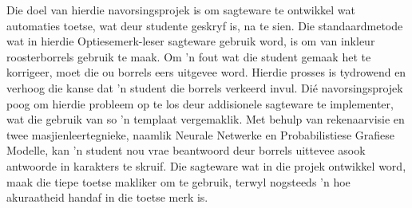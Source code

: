 
\begin{uittreksel}    %
Die doel van hierdie navorsingsprojek is om sagteware te ontwikkel wat automaties toetse, wat deur studente geskryf is, na te sien. Die standaardmetode wat in hierdie Optiesemerk-leser sagteware gebruik word, is om van inkleur roosterborrels gebruik te maak. Om 'n fout wat die student gemaak het te korrigeer, moet die ou borrels eers uitgevee word. Hierdie prosses is tydrowend en verhoog die kanse dat 'n student die borrels verkeerd invul. Dié navorsingsprojek poog om hierdie probleem op te los deur addisionele sagteware te implementer, wat die gebruik van so 'n templaat vergemaklik. Met behulp van rekenaarvisie en twee masjienleertegnieke, naamlik Neurale Netwerke en Probabilistiese Grafiese Modelle, kan 'n student nou vrae beantwoord deur borrels uittevee asook antwoorde in karakters te skruif.  Die sagteware wat in die projek ontwikkel word, maak die tiepe toetse makliker om te gebruik, terwyl nogsteeds 'n hoe akuraatheid handaf in die toetse merk is.
\end{uittreksel}